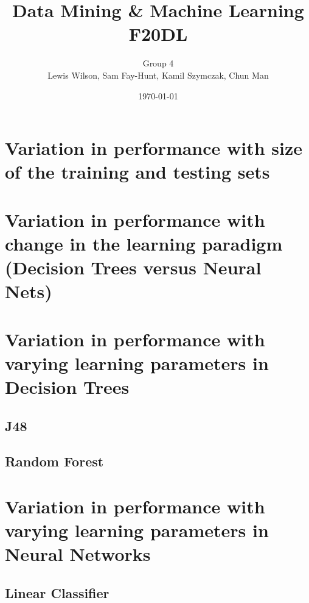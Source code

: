 \documentclass[11pt]{article}
\begin{document}
\title{\huge Data Mining \& Machine Learning F20DL} 
\author{Group 4\\Lewis Wilson, Sam Fay-Hunt, Kamil Szymczak, Chun Man }
\date{\today}
\maketitle

\newpage
\tableofcontents
\thispagestyle{empty}
\pagebreak
\setcounter{page}{1}

\newpage
\section{Variation in performance with size of the training and testing sets}

\newpage
\section{Variation in performance with change in the learning paradigm (Decision Trees versus
Neural Nets)}

\newpage
\section{Variation in performance with varying learning parameters in Decision Trees}
\subsection{J48}



\newpage
\subsection{Random Forest}



\newpage
\section{Variation in performance with varying learning parameters in Neural Networks}
\subsection{Linear Classifier}
\end{document}

